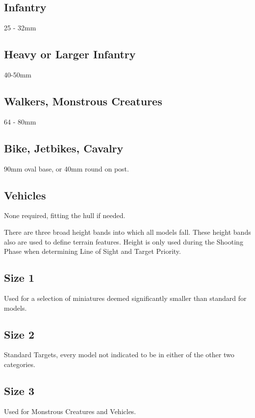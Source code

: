 \subsection{Infantry}
25 - 32mm

\subsection{Heavy or Larger Infantry}
40-50mm

\subsection{Walkers, Monstrous Creatures}
64 - 80mm

\subsection{Bike, Jetbikes, Cavalry}
90mm oval base, or 40mm round on post.

\subsection{Vehicles}
None required, fitting the hull if needed.

There are three broad height bands into which all models fall.
These height bands also are used to define terrain features. Height
is only used during the Shooting Phase when determining Line of
Sight and Target Priority.

\subsection{Size 1}
Used for a selection of miniatures deemed significantly smaller
than standard for models.

\subsection{Size 2}
Standard Targets, every model not indicated to be in either of the
other two categories.

\subsection{Size 3}
Used for Monstrous Creatures and Vehicles.
